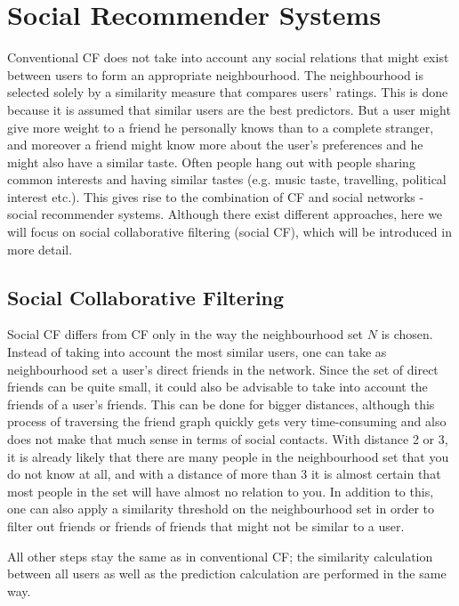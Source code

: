 \section{Social Recommender Systems}
\label{st:socialrecommendersystems} Conventional CF does not take into account any social relations that might exist between users to form an appropriate neighbourhood. The neighbourhood is selected solely by a similarity measure that compares users' ratings. This is done because it is assumed that similar users are the best predictors. But a user might give more weight to a friend he personally knows than to a complete stranger, and moreover a friend might know more about the user's preferences and he might also have a similar taste. Often people hang out with people sharing common interests and having similar tastes (e.g. music taste, travelling, political interest etc.). This gives rise to the combination of CF and social networks - social recommender systems. Although there exist different approaches, here we will focus on social collaborative filtering (social CF), which will be introduced in more detail.

\subsection{Social Collaborative Filtering}
\label{sst:socialcf} Social CF differs from CF only in the way the neighbourhood set $N$ is chosen. Instead of taking into account the most similar users, one can take as neighbourhood set a user's direct friends in the network. Since the set of direct friends can be quite small, it could also be advisable to take into account the friends of a user's friends. This can be done for bigger distances, although this process of traversing the friend graph quickly gets very time-consuming and also does not make that much sense in terms of social contacts. With distance 2 or 3, it is already likely that there are many people in the neighbourhood set that you do not know at all, and with a distance of more than 3 it is almost certain that most people in the set will have almost no relation to you. In addition to this, one can also apply a similarity threshold on the neighbourhood set in order to filter out friends or friends of friends that might not be similar to a user.

All other steps stay the same as in conventional CF; the similarity calculation between all users as well as the prediction calculation are performed in the same way.